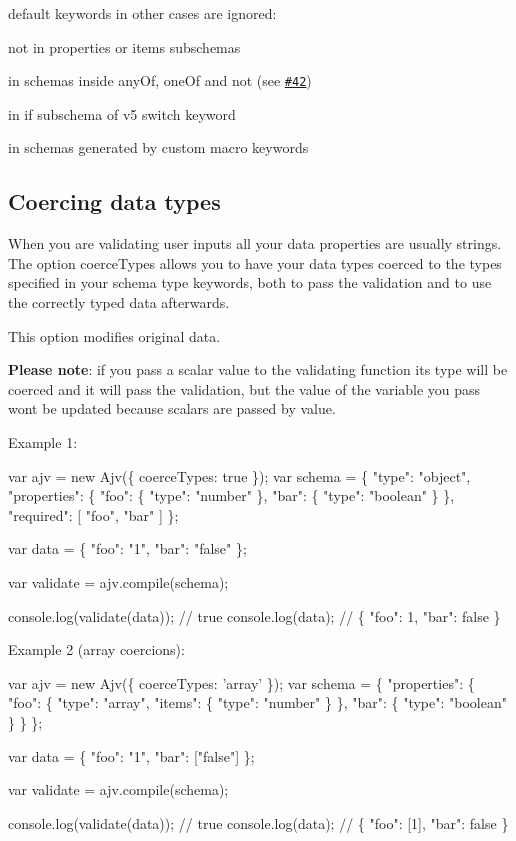 {\ttfamily default} keywords in other cases are ignored\+:


\begin{DoxyItemize}
\item not in {\ttfamily properties} or {\ttfamily items} subschemas
\item in schemas inside {\ttfamily any\+Of}, {\ttfamily one\+Of} and {\ttfamily not} (see \href{https://github.com/epoberezkin/ajv/issues/42}{\tt \#42})
\item in {\ttfamily if} subschema of v5 {\ttfamily switch} keyword
\item in schemas generated by custom macro keywords
\end{DoxyItemize}

\subsection*{Coercing data types}

When you are validating user inputs all your data properties are usually strings. The option {\ttfamily coerce\+Types} allows you to have your data types coerced to the types specified in your schema {\ttfamily type} keywords, both to pass the validation and to use the correctly typed data afterwards.

This option modifies original data.

{\bfseries Please note}\+: if you pass a scalar value to the validating function its type will be coerced and it will pass the validation, but the value of the variable you pass won\textquotesingle{}t be updated because scalars are passed by value.

Example 1\+:


\begin{DoxyCode}
var ajv = new Ajv(\{ coerceTypes: true \});
var schema = \{
  "type": "object",
  "properties": \{
    "foo": \{ "type": "number" \},
    "bar": \{ "type": "boolean" \}
  \},
  "required": [ "foo", "bar" ]
\};

var data = \{ "foo": "1", "bar": "false" \};

var validate = ajv.compile(schema);

console.log(validate(data)); // true
console.log(data); // \{ "foo": 1, "bar": false \}
\end{DoxyCode}


Example 2 (array coercions)\+:


\begin{DoxyCode}
var ajv = new Ajv(\{ coerceTypes: 'array' \});
var schema = \{
  "properties": \{
    "foo": \{ "type": "array", "items": \{ "type": "number" \} \},
    "bar": \{ "type": "boolean" \}
  \}
\};

var data = \{ "foo": "1", "bar": ["false"] \};

var validate = ajv.compile(schema);

console.log(validate(data)); // true
console.log(data); // \{ "foo": [1], "bar": false \}
\end{DoxyCode}


